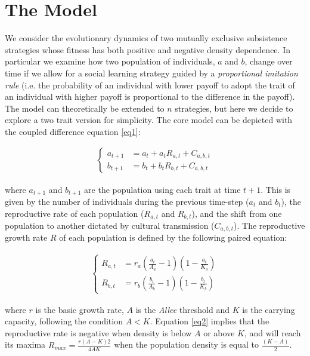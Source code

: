 \documentclass[preprint,authoryear]{elsarticle}
\begin{document}
\section{The Model}
We consider the evolutionary dynamics of two mutually exclusive subsistence strategies whose fitness has both positive and negative density dependence. In particular we examine how two population of individuals, $a$ and $b$, change over time if we allow for a social learning strategy guided by a \emph{proportional imitation rule} (i.e. the probability of an individual with lower payoff to adopt the trait of an individual with higher payoff is proportional to the difference in the payoff). The model can theoretically be extended to $n$ strategies, but here we decide to explore a two trait version for simplicity. The core model can be depicted with the coupled difference equation \eqref{eq1}:

\begin{align}
\begin{cases}
a_{t+1}& = a_t + a_t R_{a,t} + C_{a,b,t} \\
b_{t+1}& = b_t + b_t R_{b,t} + C_{a,b,t}
\end{cases}
\label{eq1}
\end{align}

where $a_{t+1}$ and $b_{t+1}$ are the population using each trait at time $t+1$. This is given by the number of individuals during the previous time-step ($a_t$ and $b_t$), the reproductive rate of each population ($R_{a,t}$ and $R_{b,t}$), and the shift from one population to another dictated by cultural transmission ($C_{a,b,t}$).
The reproductive growth rate $R$ of each population is defined by the following paired equation:

\begin{align}
\begin{cases}
R_{a,t}& = r_a (\frac{a_t}{A_a}-1)(1-\frac{a_t}{K_a})\\
R_{b,t}& = r_b (\frac{b_t}{A_b}-1)(1-\frac{b_t}{K_b}) 
\end{cases}
\label{eq2}
\end{align}

where $r$ is the basic growth rate, $A$ is the \emph{Allee} threshold and $K$ is the carrying capacity, following the condition $A < K$. Equation \eqref{eq2} implies that the reproductive rate is negative when density is below $A$ or above $K$, and will reach its maxima $R_{max}=\frac{r(A-K)2}{4AK}$ when the population density is equal to $\frac{(K-A)}{2}$. 
\end{document}
